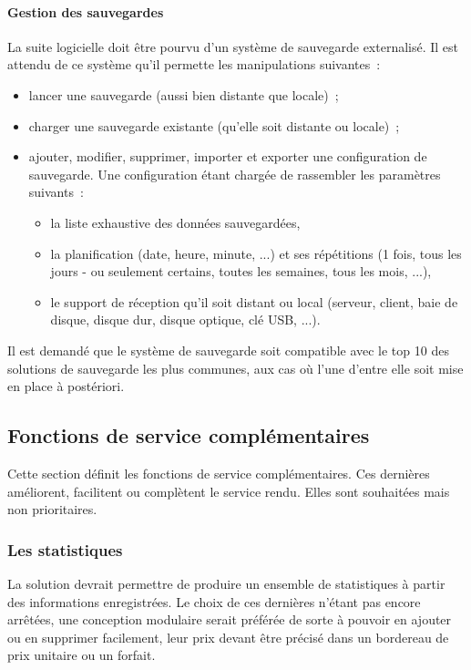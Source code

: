 \paragraph{Gestion des sauvegardes}
La suite logicielle doit être pourvu d'un système de sauvegarde externalisé. Il est attendu de ce système qu'il permette les manipulations suivantes~:
\begin{itemize}
	\item lancer une sauvegarde (aussi bien distante que locale)~;
	\item charger une sauvegarde existante (qu'elle soit distante ou locale)~;
	\item ajouter, modifier, supprimer, importer et exporter une configuration de sauvegarde. Une configuration étant chargée de rassembler les paramètres suivants~:
	\begin{itemize}
		\item la liste exhaustive des données sauvegardées,
		\item la planification (date, heure, minute, ...) et ses répétitions (1 fois, tous les jours - ou seulement certains, toutes les semaines, tous les mois, ...),
		\item le support de réception qu'il soit distant ou local (serveur, client, baie de disque, disque dur, disque optique, clé USB, ...).
	\end{itemize}
\end{itemize}
\begin{constraint}
Il est demandé que le système de sauvegarde soit compatible avec le top 10 des solutions de sauvegarde les plus communes, aux cas où l'une d'entre elle soit mise en place à postériori.
\end{constraint}





\subsection{Fonctions de service complémentaires}
Cette section définit les fonctions de service complémentaires. Ces dernières améliorent, facilitent ou complètent le service rendu. Elles sont souhaitées mais non prioritaires.

\subsubsection{Les statistiques}
La solution devrait permettre de produire un ensemble de statistiques à partir des informations enregistrées. Le choix de ces dernières n'étant pas encore arrêtées, une conception modulaire serait préférée de sorte à pouvoir en ajouter ou en supprimer facilement, leur prix devant être précisé dans un bordereau de prix unitaire ou un forfait.

